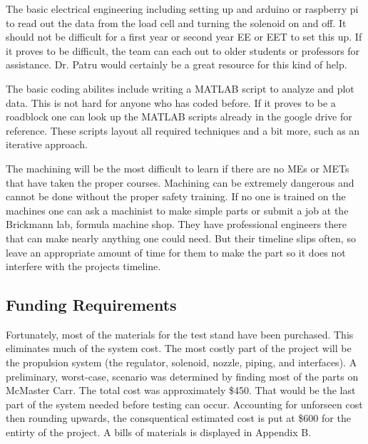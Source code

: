 \documentclass[conference]{IEEEtran} %
\begin{document}
The basic electrical engineering including setting up and arduino or raspberry pi to read out the data from the load cell and turning the solenoid on and off. It
should not be difficult for a first year or second year EE or EET to set this up. If it proves to be difficult, the team can each out to older students or professors for assistance.
Dr. Patru would certainly be a great resource for this kind of help.

The basic coding abilites include writing a MATLAB script to analyze and plot data. This is not hard for anyone who has coded before. If it proves to be a roadblock
one can look up the MATLAB scripts already in the google drive for reference. These scripts layout all required techniques and a bit more, such as an iterative approach.

The machining will be the most difficult to learn if there are no MEs or METs that have taken the proper courses. Machining can be extremely dangerous and cannot be done
without the proper safety training. If no one is trained on the machines one can ask a machinist to make simple parts or submit a job at the Brickmann lab, formula machine shop.
They have professional engineers there that can make nearly anything one could need. But their timeline slips often, so leave an appropriate amount of time for them to make the part
so it does not interfere with the projects timeline.

\subsection{Funding Requirements}
Fortunately, most of the materials for the test stand have been purchased. This eliminates much of the system cost. The most costly part of the project
will be the propulsion system (the regulator, solenoid, nozzle, piping, and interfaces). A preliminary, worst-case, scenario was determined by finding most of the parts
on McMaster Carr. The total cost was approximately \$450. That would be the last part of the system needed before testing can occur. Accounting for unforseen cost then rounding upwards,
the consquentical estimated cost is put at \$600 for the entirty of the project. A bills of materials is displayed in Appendix B.
\end{document}
